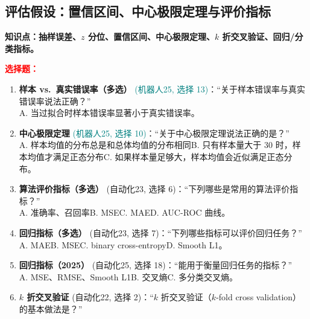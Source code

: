 ﻿\documentclass[../main.tex]{subfiles}
\begin{document}
\subsection{评估假设：置信区间、中心极限定理与评价指标}

\noindent\textbf{知识点：抽样误差、$z$ 分位、置信区间、中心极限定理、$k$ 折交叉验证、回归/分类指标。}

\noindent\textbf{\textcolor{red}{选择题：}}
\begin{enumerate}[itemsep=0.45em, topsep=0.2em, leftmargin=1.5em]
    \item \textbf{样本 vs.\ 真实错误率（多选）} \textcolor{teal}{(机器人25, 选择 13)}：``关于样本错误率与真实错误率说法正确？''\\
    A. 当过拟合时样本错误率显著小于真实错误率\quad {}\quad {}\quad {}。 
    
    \item \textbf{中心极限定理} \textcolor{teal}{(机器人25, 选择 10)}：``关于中心极限定理说法正确的是？''\\
    A. 样本均值的分布总是和总体均值的分布相同\quad B. 只有样本量大于 30 时，样本均值才满足正态分布\quad C. 如果样本量足够大，样本均值会近似满足正态分布\quad {}。 

    \item \textbf{算法评价指标（多选）} \textcolor{autoclassgreen}{(自动化23, 选择 6)}：``下列哪些是常用的算法评价指标？''\\
    A. 准确率、召回率\quad B. MSE\quad C. MAE\quad D. AUC-ROC 曲线。 

    \item \textbf{回归指标（多选）} \textcolor{autoclassgreen}{(自动化23, 选择 7)}：``下列哪些指标可以评价回归任务？''\\
    A. MAE\quad B. MSE\quad C. binary cross-entropy\quad D. Smooth L1。 

    \item \textbf{回归指标（2025）} \textcolor{autoclassgreen}{(自动化25, 选择 18)}：``能用于衡量回归任务的指标？''\\
    A. MSE、RMSE、Smooth L1\quad B. 交叉熵\quad C. 多分类交叉熵\quad {}。 

    \item \textbf{$k$ 折交叉验证} \textcolor{autoclassgreen}{(自动化22, 选择 2)}：``$k$ 折交叉验证（$k$-fold cross validation）的基本做法是？''\\
     
\end{enumerate}
\end{document}
